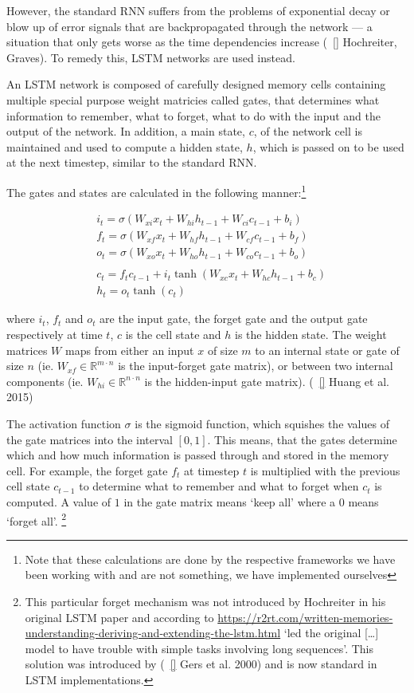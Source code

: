 However, the standard RNN suffers from the problems of exponential decay or blow
up of error signals that are backpropagated through the network --- a situation
that only gets worse as the time dependencies increase (~\ref{} Hochreiter,
Graves). To remedy this, LSTM networks are used instead.

An LSTM network is composed of carefully designed memory cells containing
multiple special purpose weight matricies called gates, that determines what
information to remember, what to forget, what to do with the input and the
output of the network. In addition, a main state, $c$, of the network cell is
maintained and used to compute a hidden state, $h$, which is passed on to be
used at the next timestep, similar to the standard RNN.

The gates and states are calculated in the following manner:\footnote{Note that
    these calculations are done by the respective frameworks we have been
working with and are not something, we have implemented ourselves}


\begin{align*}
    & i_{t} = \sigma(W_{xi}x_{t} + W_{hi}h_{t-1} + W_{ci}c_{t-1} + b_{i})    \\
    & f_{t} = \sigma(W_{xf}x_{t} + W_{hf}h_{t-1} + W_{cf}c_{t-1} + b_{f})    \\
    & o_{t} = \sigma(W_{xo}x_{t} + W_{ho}h_{t-1} + W_{co}c_{t-1} + b_{o})    \\ \\
    & c_{t} = f_{t}c_{t-1} + i_{t}\tanh(W_{xc}x_{t} + W_{hc}h_{t-1} + b_{c}) \\
    & h_{t} = o_{t}\tanh(c_{t})
\end{align*}

where $i_{t}$, $f_{t}$ and $o_{t}$ are the input gate, the forget gate and the
output gate respectively at time $t$, $c$ is the cell state and $h$ is the
hidden state. The weight matrices $W$ maps from either an input $x$ of size $m$
to an internal state or gate of size $n$ (ie. $W_{xf} \in \mathbb{R}^{m \cdot
n}$ is the input-forget gate matrix), or between two internal components (ie.
$W_{hi} \in \mathbb{R}^{n \cdot n}$ is the hidden-input gate matrix). (~\ref{}
Huang et al. 2015)

The activation function $\sigma$ is the sigmoid function, which squishes the
values of the gate matrices into the interval $[0,1]$. This means, that the
gates determine which and how much information is passed through and stored in
the memory cell. For example, the forget gate $f_{t}$ at timestep $t$ is
multiplied with the previous cell state $c_{t-1}$ to determine what to remember
and what to forget when $c_{t}$ is computed. A value of $1$ in the gate matrix
means `keep all' where a $0$ means `forget all'. \footnote{This particular
forget mechanism was not introduced by Hochreiter in his original LSTM paper and
according to
    \url{https://r2rt.com/written-memories-understanding-deriving-and-extending-the-lstm.html}
    `led the original [\ldots] model to have trouble with simple tasks involving
    long sequences'. This solution was introduced by (~\ref{} Gers et al. 2000)
and is now standard in LSTM implementations.}

